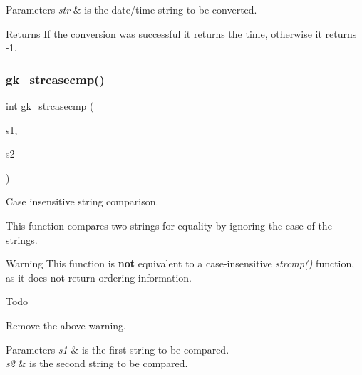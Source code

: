 \begin{DoxyParams}{Parameters}
{\em str} & is the date/time string to be converted. \\
\hline
\end{DoxyParams}
\begin{DoxyReturn}{Returns}
If the conversion was successful it returns the time, otherwise it returns -\/1. 
\end{DoxyReturn}
\mbox{\label{a00077_a47570da67818e57e97fdd464bc60fbd1}} 
\subsubsection{\texorpdfstring{gk\+\_\+strcasecmp()}{gk\_strcasecmp()}}
{\footnotesize\ttfamily int gk\+\_\+strcasecmp (\begin{DoxyParamCaption}\item[{char $\ast$}]{s1,  }\item[{char $\ast$}]{s2 }\end{DoxyParamCaption})}



Case insensitive string comparison. 

This function compares two strings for equality by ignoring the case of the strings.

\begin{DoxyWarning}{Warning}
This function is {\bfseries not} equivalent to a case-\/insensitive {\itshape strcmp()} function, as it does not return ordering information.
\end{DoxyWarning}
\begin{DoxyRefDesc}{Todo}
\item[\hyperlink{a00626__todo000001}{Todo}]Remove the above warning.\end{DoxyRefDesc}



\begin{DoxyParams}{Parameters}
{\em s1} & is the first string to be compared. \\
\hline
{\em s2} & is the second string to be compared. \\
\hline
\end{DoxyParams}

